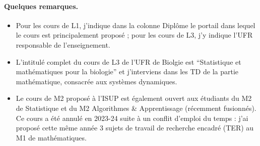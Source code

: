 \begin{table}[h]
  \centering
    {\footnotesize
      
    \caption{Bilan du service d'enseignement depuis mon arrivée à \SU. \label{tab:serviceSU}}
    }
\end{table}

\paragraph{Quelques remarques.}
\begin{itemize}
  \item Pour les cours de L1, j'indique dans la colonne Diplôme le portail dans lequel le cours est principalement proposé ; pour les cours de L3, j'y indique l'UFR responsable de l'enseignement.
  \item L'intitulé complet du cours de L3 de l'UFR de Biolgie est ``Statistique et mathématiques pour la biologie'' et j'interviens dans les TD de la partie mathématique, consacrée aux systèmes dynamiques.
  \item Le cours de M2 proposé à l'ISUP est également ouvert aux étudiants du M2 de Statistique et du M2 Algorithmes \& Apprentissage (récemment fusionnés). Ce cours a été annulé en 2023-24 suite à un conflit d'emploi du temps : j'ai proposé cette même année 3 sujets de travail de recherche encadré (TER) au M1 de mathématiques.
\end{itemize}

